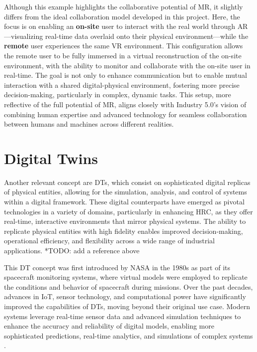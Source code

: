     Although this example highlights the collaborative potential of \ac{MR}, it slightly differs from the ideal collaboration model developed in this project. Here, the focus is on enabling an \textbf{on-site} user to interact with the real world through \ac{AR}—visualizing real-time data overlaid onto their physical environment—while the \textbf{remote} user experiences the same \ac{VR} environment. This configuration allows the remote user to be fully immersed in a virtual reconstruction of the on-site environment, with the ability to monitor and collaborate with the on-site user in real-time. The goal is not only to enhance communication but to enable mutual interaction with a shared digital-physical environment, fostering more precise decision-making, particularly in complex, dynamic tasks. This setup, more reflective of the full potential of \ac{MR}, aligns closely with Industry 5.0’s vision of combining human expertise and advanced technology for seamless collaboration between humans and machines across different realities.

\section{Digital Twins}
\label{sec:dt}
Another relevant concept are \ac{DTs}, which consist on sophisticated digital replicas of physical entities, allowing for the simulation, analysis, and control of systems within a digital framework. These digital counterparts have emerged as pivotal technologies in a variety of domains, particularly in enhancing \ac{HRC}, as they offer real-time, interactive environments that mirror physical systems. The ability to replicate physical entities with high fidelity enables improved decision-making, operational efficiency, and flexibility across a wide range of industrial applications.
*TODO: add a reference above

This \ac{DT} concept was first introduced by NASA in the 1980s as part of its spacecraft monitoring systems, where virtual models were employed to replicate the conditions and behavior of spacecraft during missions. Over the past decades, advances in \ac{IoT}, sensor technology, and computational power have significantly improved the capabilities of \ac{DTs}, moving beyond their original use case. Modern systems leverage real-time sensor data and advanced simulation techniques to enhance the accuracy and reliability of digital models, enabling more sophisticated predictions, real-time analytics, and simulations of complex systems \cite{liu2022digitaltwin}.

